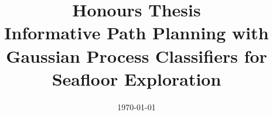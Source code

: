 \documentclass[a4paper, 11pt, oneside]{Thesis}  %
\begin{document}
\frontmatter      %

\title  {Honours Thesis \\ \textnormal{Informative Path Planning with Gaussian Process Classifiers for Seafloor Exploration}}
\addresses  {\groupname\\\deptname\\\univname}  %
\date       {\today}
\subject    {}
\keywords   {}

\maketitle


\fancyhead{}  %
\rhead{\thepage}  %
\lhead{}  %

\pagestyle{fancy}  %
\end{document}
